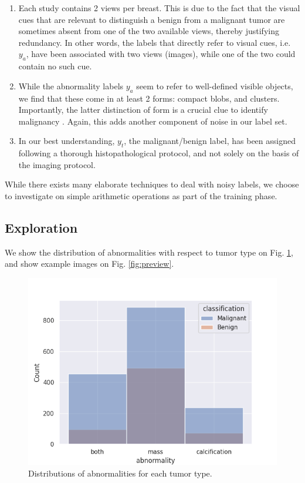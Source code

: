 \documentclass[11pt]{article}
\begin{document}
\begin{enumerate}
\item Each study contains 2 views per breast. This is due to the fact that the visual cues
that are relevant to distinguish a benign from a malignant tumor are
 sometimes absent from one of the two available views, thereby justifying redundancy.
 In other words, the labels that directly refer to visual cues, i.e. \(y_{a}\),
 have been associated with two views (images), while one of the two could contain no
 such cue.

\item While the abnormality labels \(y_{a}\) seem to refer to well-defined visible objects,
we find that these come in at least 2 forms: compact blobs, and clusters.
Importantly, the latter distinction of form is a crucial clue
to identify malignancy \autocite{azam21}.
Again, this adds another component of noise in our label set.

\item In our best understanding, \(y_{t}\), the malignant/benign label, has been
assigned following a thorough histopathological protocol, and not solely on the
basis of the imaging protocol.
\end{enumerate}

While there exists many elaborate techniques to deal with noisy labels,
we choose to investigate on simple arithmetic operations as part of the
training phase.

\subsection{Exploration}
\label{sec:org3866a35}

We show the distribution of abnormalities with respect to tumor type on Fig. \ref{fig:distributions},
and show example images on Fig. \ref{fig:preview}.

\begin{figure}[htbp]
\centering
\includegraphics[width=.9\linewidth]{./images/distrib.png}
\caption{\label{fig:distributions}Distributions of abnormalities for each tumor type.}
\end{figure}
\end{document}
